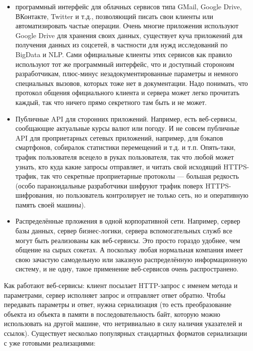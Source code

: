\documentclass[a5paper]{article}
\begin{document}
\begin{itemize}
    \item программный интерфейс для облачных сервисов типа GMail, Google Drive, ВКонтакте, Twitter и т.д., позволяющий писать свои клиенты или автоматизировать частые операции. Очень многие приложения используют Google Drive для хранения своих данных, существует куча приложений для получения данных из соцсетей, в частности для нужд исследований по BigData и NLP. Сами официальные клиенты этих сервисов как правило используют тот же программный интерфейс, что и доступный стороноим разработчикам, плюс-минус незадокументированные параметры и немного специальных вызовов, которых тоже нет в документации. Надо понимать, что протокол общения официального клиента и сервера может легко прочитать каждый, так что ничего прямо секретного там быть и не может.
    \item Публичные API для сторонних приложений. Например, есть веб-сервисы, сообщающие актуальные курсы валют или погоду. И не совсем публичные API для проприетарных сетевых приложений, например, для бэкапов смартфонов, собиралок статистики перемещений и т.д. и т.п. Опять-таки, трафик пользователя всецело в руках пользователя, так что любой может узнать, кто куда какие запросы отправляет, и читать свой исходящий HTTPS-трафик, так что секретные проприетарные протоколы --- большая редкость (особо параноидальные разработчики шифруют трафик поверх HTTPS-шифрования, но пользователь контролирует не только сеть, но и оперативную память своей машины).
    \item Распределённые прложения в одной корпоративной сети. Например, сервер базы данных, сервер бизнес-логики, сервера вспомогательных служб все могут быть реализованы как веб-сервисы. Это просто гораздо удобнее, чем общение на сырых сокетах. А поскольку любая нормальная компания имеет свою зачастую самодельную или заказную распределённую информационную систему, и не одну, такое применение веб-сервисов очень распространено.
\end{itemize}

Как работают веб-сервисы: клиент посылает HTTP-запрос с именем метода и параметрами, сервер исполняет запрос и отправляет ответ обратно. Чтобы передавать параметры и ответ, нужна сериализация (то есть преобразование объекта из объекта в памяти в последовательность байт, которую можно использовать на другой машине, что нетривиально в силу наличия указателей и ссылок). Существует несколько популярных стандартных форматов сериализации с уже готовыми реализациями:
\end{document}
